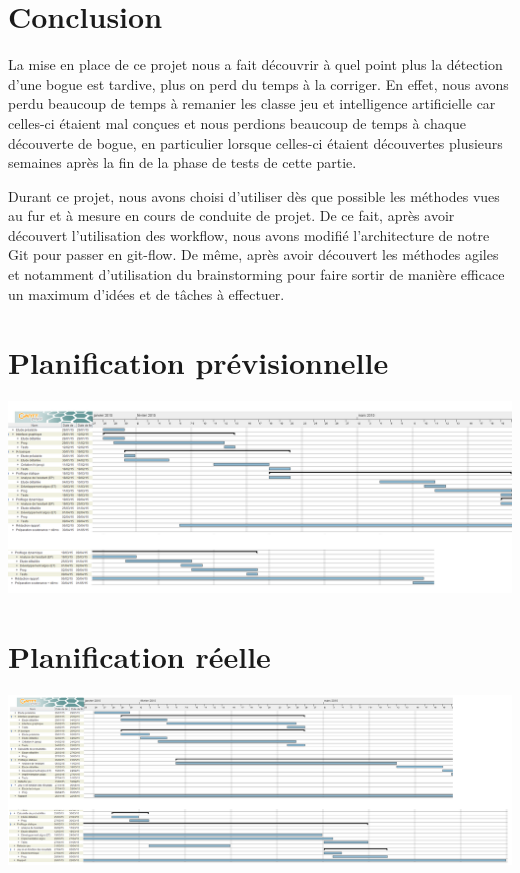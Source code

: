 \documentclass{report}
\begin{document}
\chapter{Conclusion}

\hspace{0.5cm}La mise en place de ce projet nous a fait découvrir à quel point plus la détection d'une bogue est tardive, plus on perd du temps à la corriger. En effet, nous avons perdu beaucoup de temps à remanier les classe jeu et intelligence artificielle car celles-ci étaient mal conçues et nous perdions beaucoup de temps à chaque découverte de bogue, en particulier lorsque celles-ci étaient découvertes plusieurs semaines après la fin de la phase de tests de cette partie. \par
Durant ce projet, nous avons choisi d'utiliser dès que possible les méthodes vues au fur et à mesure en cours de conduite de projet. De ce fait, après avoir découvert l'utilisation des workflow, nous avons modifié l'architecture de notre Git pour passer en git-flow. De même, après avoir découvert les méthodes agiles et notamment d'utilisation du brainstorming pour faire sortir de manière efficace un maximum d'idées et de tâches à effectuer. \par

\appendix
\chapter{Planification prévisionnelle}
		 \hspace{-2.5cm} 
			\includegraphics[scale=0.28]{../DiagrammePrevisionnel.png}
	\medskip

\chapter{Planification réelle}
		 \hspace{-2.7cm} 
			\includegraphics[scale=0.24]{../DiagrammeReel.png}

	\medskip
\end{document}

